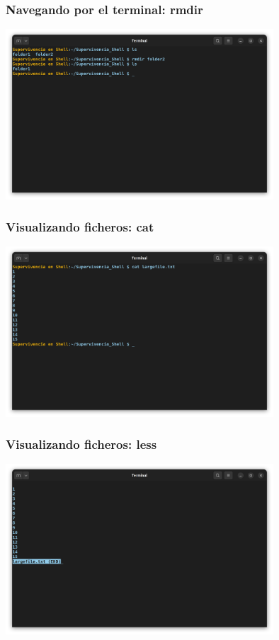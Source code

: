 \documentclass[10pt]{beamer}
\begin{document}
	\begin{frame}
		\frametitle{Navegando por el terminal: rmdir}
		\includegraphics[width=0.75\textwidth]{rmdir}
	\end{frame}
	
	\begin{frame}
		\frametitle{Visualizando ficheros: cat}
		\includegraphics[width=0.75\textwidth]{cat}
	\end{frame}	
	
	\begin{frame}
		\frametitle{Visualizando ficheros: less}
		\includegraphics[width=0.75\textwidth]{less}
	\end{frame}
		
\end{document}
